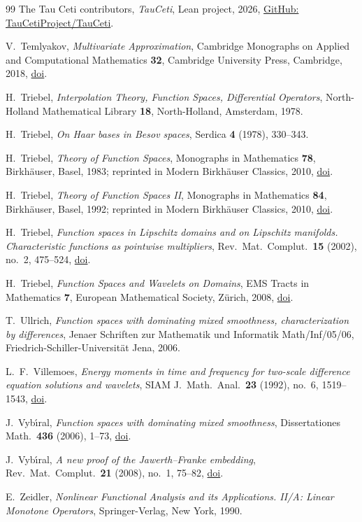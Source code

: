 \begin{thebibliography}{99}
The Tau Ceti contributors,
\emph{TauCeti}, Lean project, 2026,
\href{https://github.com/TauCetiProject/TauCeti}{GitHub: TauCetiProject/TauCeti}.

V.~Temlyakov,
\emph{Multivariate Approximation},
Cambridge Monographs on Applied and Computational Mathematics \textbf{32}, Cambridge
University Press, Cambridge, 2018,
\href{https://doi.org/10.1017/9781108689687}{doi}.

H.~Triebel,
\emph{Interpolation Theory, Function Spaces, Differential Operators},
North-Holland Mathematical Library \textbf{18}, North-Holland, Amsterdam, 1978.

H.~Triebel,
\emph{On Haar bases in Besov spaces},
Serdica \textbf{4} (1978), 330--343.

H.~Triebel,
\emph{Theory of Function Spaces},
Monographs in Mathematics \textbf{78}, Birkh\"auser, Basel, 1983; reprinted in Modern
Birkh\"auser Classics, 2010,
\href{https://doi.org/10.1007/978-3-0346-0416-1}{doi}.

H.~Triebel,
\emph{Theory of Function Spaces II},
Monographs in Mathematics \textbf{84}, Birkh\"auser, Basel, 1992; reprinted in Modern
Birkh\"auser Classics, 2010,
\href{https://doi.org/10.1007/978-3-0346-0419-2}{doi}.

H.~Triebel,
\emph{Function spaces in Lipschitz domains and on Lipschitz manifolds. Characteristic functions as
pointwise multipliers}, Rev.\ Mat.\ Complut.\ \textbf{15} (2002), no.~2, 475--524,
\href{https://doi.org/10.5209/rev_REMA.2002.v15.n2.16910}{doi}.

H.~Triebel,
\emph{Function Spaces and Wavelets on Domains},
EMS Tracts in Mathematics \textbf{7}, European Mathematical Society, Z\"urich, 2008,
\href{https://doi.org/10.4171/019}{doi}.

T.~Ullrich,
\emph{Function spaces with dominating mixed smoothness, characterization by differences},
Jenaer Schriften zur Mathematik und Informatik Math/Inf/05/06, Friedrich-Schiller-Universit\"at
Jena, 2006.

L.~F.~Villemoes,
\emph{Energy moments in time and frequency for two-scale difference equation solutions and
wavelets},
SIAM J.\ Math.\ Anal.\ \textbf{23} (1992), no.~6, 1519--1543,
\href{https://doi.org/10.1137/0523085}{doi}.

J.~Vyb\'{\i}ral,
\emph{Function spaces with dominating mixed smoothness},
Dissertationes Math.\ \textbf{436} (2006), 1--73,
\href{https://doi.org/10.4064/dm436-0-1}{doi}.

J.~Vyb\'{\i}ral,
\emph{A new proof of the Jawerth--Franke embedding},
Rev.\ Mat.\ Complut.\ \textbf{21} (2008), no.~1, 75--82,
\href{https://doi.org/10.5209/rev_REMA.2008.v21.n1.16435}{doi}.

E.~Zeidler,
\emph{Nonlinear Functional Analysis and its Applications. II/A: Linear Monotone Operators},
Springer-Verlag, New York, 1990.

\end{thebibliography}
